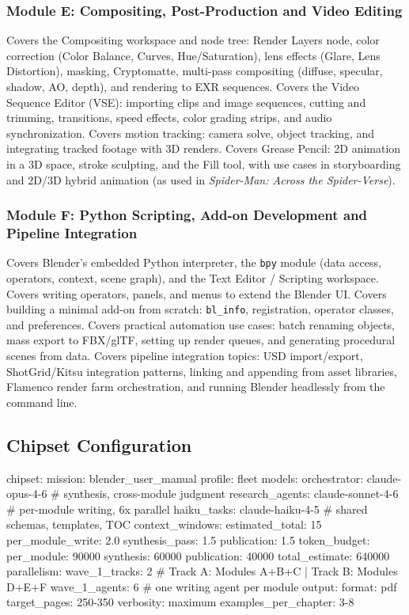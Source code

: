 \documentclass[11pt,letterpaper]{article}
\begin{document}
\subsubsection{Module E: Compositing, Post-Production and Video Editing}

Covers the Compositing workspace and node tree: Render Layers node, color correction (Color Balance, Curves, Hue/Saturation), lens effects (Glare, Lens Distortion), masking, Cryptomatte, multi-pass compositing (diffuse, specular, shadow, AO, depth), and rendering to EXR sequences. Covers the Video Sequence Editor (VSE): importing clips and image sequences, cutting and trimming, transitions, speed effects, color grading strips, and audio synchronization. Covers motion tracking: camera solve, object tracking, and integrating tracked footage with 3D renders. Covers Grease Pencil: 2D animation in a 3D space, stroke sculpting, and the Fill tool, with use cases in storyboarding and 2D/3D hybrid animation (as used in \textit{Spider-Man: Across the Spider-Verse}).

\subsubsection{Module F: Python Scripting, Add-on Development and Pipeline Integration}

Covers Blender's embedded Python interpreter, the \texttt{bpy} module (data access, operators, context, scene graph), and the Text Editor / Scripting workspace. Covers writing operators, panels, and menus to extend the Blender UI. Covers building a minimal add-on from scratch: \texttt{bl\_info}, registration, operator classes, and preferences. Covers practical automation use cases: batch renaming objects, mass export to FBX/glTF, setting up render queues, and generating procedural scenes from data. Covers pipeline integration topics: USD import/export, ShotGrid/Kitsu integration patterns, linking and appending from asset libraries, Flamenco render farm orchestration, and running Blender headlessly from the command line.

\subsection{Chipset Configuration}

\begin{asciibox}
chipset:
  mission: blender_user_manual
  profile: fleet
  models:
    orchestrator: claude-opus-4-6       # synthesis, cross-module judgment
    research_agents: claude-sonnet-4-6  # per-module writing, 6x parallel
    haiku_tasks: claude-haiku-4-5       # shared schemas, templates, TOC
  context_windows:
    estimated_total: 15
    per_module_write: 2.0
    synthesis_pass: 1.5
    publication: 1.5
  token_budget:
    per_module: 90000
    synthesis: 60000
    publication: 40000
    total_estimate: 640000
  parallelism:
    wave_1_tracks: 2        # Track A: Modules A+B+C  |  Track B: Modules D+E+F
    wave_1_agents: 6        # one writing agent per module
  output:
    format: pdf
    target_pages: 250-350
    verbosity: maximum
    examples_per_chapter: 3-8
\end{asciibox}
\end{document}
